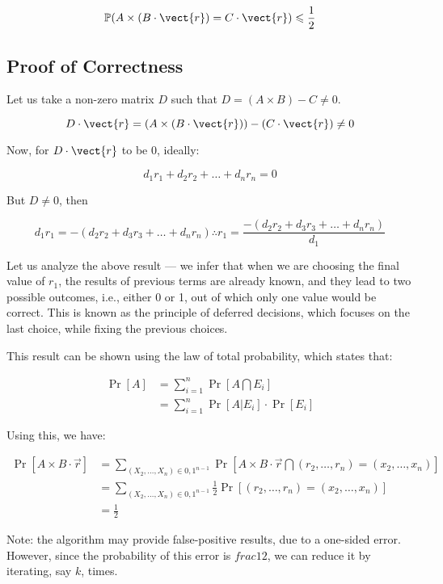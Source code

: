         \[
            \Pr(A \times (B \cdot \vect{r}) = C \cdot \vect{r}) \leq \frac{1}{2}
        \]

    \subsection*{Proof of Correctness}
        Let us take a non-zero matrix \(D\) such that \(D = (A \times B) - C \ne 0\). 

        \[
            D \cdot \vect{r} = (A \times (B \cdot \vect{r})) - (C \cdot \vect{r}) \ne 0
        \]

        Now, for \(D \cdot \vect{r}\) to be 0, ideally:

        \[
            d_1 r_1 + d_2 r_2 + \dots + d_n r_n = 0
        \]

        But \(D \ne 0\), then

        \[
            d_1 r_1 = -(d_2 r_2 + d_3 r_3 + \dots + d_n r_n)
            \therefore r_1 = \frac{-(d_2 r_2 + d_3 r_3 + \dots + d_n r_n)}{d_1}
        \]

        Let us analyze the above result --- we infer that when we are choosing the final value of \(r_1\), the results of previous terms are already known, and they lead to two possible outcomes, i.e., either 0 or 1, out of which only one value would be correct. This is known as the principle of deferred decisions, which focuses on the last choice, while fixing the previous choices.

        This result can be shown using the law of total probability, which states that:

        \[
            \begin{aligned}
                \Pr[A] & = \sum_{i = 1}^{n} \Pr[A \bigcap E_i]\\
                & = \sum_{i = 1}^{n} \Pr[A | E_i] \cdot \Pr[E_i]
            \end{aligned}
        \]

        Using this, we have:

        \[
            \begin{aligned}
                \Pr[A \times B \cdot \vec{r}] & = \sum_{(X_2, \dots, X_n) \in {0, 1}^{n - 1}} \Pr[A \times B \cdot \vec{r} \bigcap (r_2, \dots, r_n) = (x_2, \dots, x_n)]\\
                & = \sum_{(X_2, \dots, X_n) \in {0, 1}^{n - 1}} \frac{1}{2} \Pr[(r_2, \dots, r_n) = (x_2, \dots, x_n)]\\
                & = \frac{1}{2}
            \end{aligned}
        \]

        Note: the algorithm may provide false-positive results, due to a one-sided error. However, since the probability of this error is \(frac{1}{2}\), we can reduce it by iterating, say \(k\), times.
